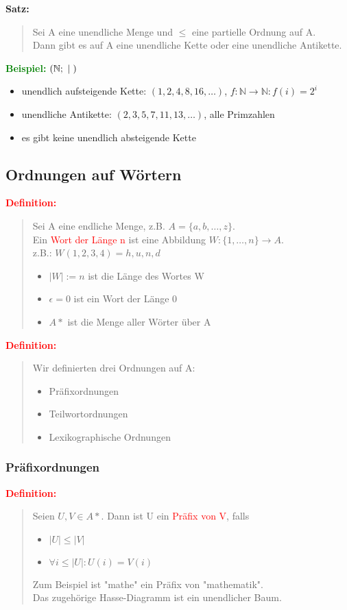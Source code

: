 \documentclass{article}
\newcommand{\smsp}{\phantom{\hspace{3px}}}
\newcommand{\red}[1]{\textcolor{red}{#1}}
\newcommand{\green}[1]{\textcolor{green}{#1}}
\newcommand{\dgr}[1]{\textcolor{dgr}{#1}}
\newcommand{\ex}{\green{\textbf{Beispiel: }}}
\newcommand{\de}[1]{\red{\textbf{Definition: }}\begin{quote}#1\end{quote}}
\newcommand{\se}[1]{\dgr{\textbf{Satz: }}\begin{quote}#1\end{quote}}
\newcommand{\N}{\mathbb{N}}
\renewcommand{\st}{\smsp | \smsp}
\begin{document}
\se{
    Sei A eine unendliche Menge und $\le$ eine partielle Ordnung auf A.\\
    Dann gibt es auf A eine unendliche Kette oder eine unendliche Antikette.
}

\ex $(\N; \st)$
\begin{itemize}
    \item unendlich aufsteigende Kette: $(1,2,4,8,16,\dots)$, $f: \N \to \N: f(i) = 2^i$
    \item unendliche Antikette: $(2,3,5,7,11,13,\dots)$, alle Primzahlen
    \item es gibt keine unendlich absteigende Kette
\end{itemize}

\subsection{Ordnungen auf Wörtern}

\de{
    Sei A eine endliche Menge, z.B. $A = \{a,b,\dots,z\}$.\\
    Ein \red{Wort der Länge n} ist eine Abbildung $W: \{1, \dots, n\} \to A$.\\
    z.B.: $W(1,2,3,4) = h,u,n,d$
    \begin{itemize}
        \item $|W| := n$ ist die Länge des Wortes W
        \item $\epsilon = 0$ ist ein Wort der Länge 0
        \item $A*$ ist die Menge aller Wörter über A
    \end{itemize}
}

\de{
    Wir definierten drei Ordnungen auf A:
    \begin{itemize}
        \item Präfixordnungen
        \item Teilwortordnungen
        \item Lexikographische Ordnungen
    \end{itemize}
}

\subsubsection{Präfixordnungen}

\de{
    Seien $U,V \in A*$. Dann ist U ein \red{Präfix von V}, falls
    \begin{itemize}
        \item $|U| \le |V|$
        \item $\forall i \le |U|: U(i) = V(i)$
    \end{itemize}
    Zum Beispiel ist "mathe" ein Präfix von "mathematik".\\
    Das zugehörige Hasse-Diagramm ist ein unendlicher Baum.
}
\end{document}
